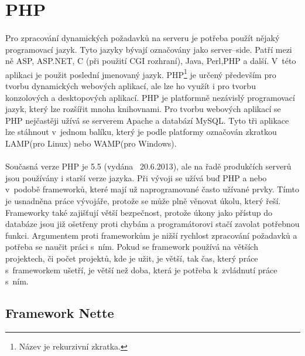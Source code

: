\documentclass[11pt,a4paper,titlepage,oneside]{book}
\begin{document}
	\section{PHP}
		\paragraph{} Pro zpracování dynamických požadavků na serveru je potřeba použít nějaký programovací jazyk. Tyto jazyky bývají označovány jako server--side. Patří mezi ně ASP, ASP.NET, C (při použití \ac{CGI} rozhraní), Java, Perl,\acs{PHP} a další. V~této aplikaci je použit poslední jmenovaný jazyk. \ac{PHP}\footnote{Název je rekurzivní zkratka.} je určený především pro tvorbu dynamických webových aplikací, ale lze ho využít i pro tvorbu konzolových a desktopových aplikací. PHP je platformně nezávislý programovací jazyk, který lze rozšířit mnoha knihovnami. Pro tvorbu webových aplikací se \ac{PHP} nejčastěji užívá se serverem Apache a databází MySQL. Tyto tři aplikace lze stáhnout v~jednom balíku, který je podle platformy označován zkratkou LAMP(pro Linux) nebo WAMP(pro Windows)\cite{wiki_php}.




		\paragraph{} Současná verze PHP je 5.5 (vydána ~20.6.2013\cite{php_net}), ale na řadě produkčích serverů jsou používány i starší verze jazyka. Při vývoji se užívá buď  PHP a nebo v~podobě frameworků, které mají už naprogramované často užívané prvky. Tímto je usnadněna práce vývojáře, protože se může plně věnovat úkolu, který řeší. Frameworky také zajišťují větší bezpečnost, protože úkony jako přístup do databáze jsou již ošetřeny proti chybám a programátorovi stačí zavolat potřebnou funkci. Argumentem proti frameworkům je nižší rychlost zpracování požadavků a potřeba se naučit práci s~ním\cite{wiki_framework}. Pokud se framework používá na větších projektech, či počet projektů, kde je užit, je větší, tak čas, který práce s~frameworkem ušetří, je větší než doba, která je potřeba k~zvládnutí práce s~ním.
		\subsection{Framework Nette}
\end{document}
